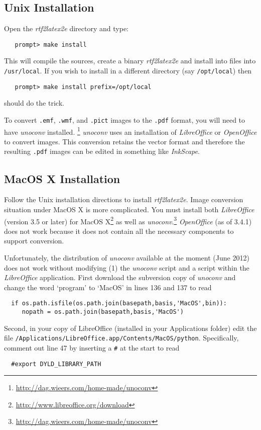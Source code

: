 \documentclass{article}
\begin{document}
\subsection{Unix Installation\label{Unix_install}}
Open the \textit{rtf2latex2e} directory and type:
\begin{verbatim}
   prompt> make install
\end{verbatim}
This will compile the sources, create a binary 
\textit{rtf2latex2e} and install into files into \texttt{/usr/local}.
If you wish to install in a different directory (say \texttt{/opt/local})
then 
\begin{verbatim}
   prompt> make install prefix=/opt/local
\end{verbatim}
should do the trick.

To convert \texttt{.emf}, \texttt{.wmf}, and \texttt{.pict} images to
the \texttt{.pdf} format, you will need to have \textit{unoconv} installed.%
\footnote{\url{http://dag.wieers.com/home-made/unoconv}}  \textit{unoconv} uses
an installation of \textit{LibreOffice} or \textit{OpenOffice} to convert images.
This conversion retains the vector format and therefore the resulting \texttt{.pdf}
images can be edited in something like \textit{InkScape}.

\subsection{MacOS X Installation}

Follow the Unix installation directions to install \textit{rtf2latex2e}.
Image conversion situation under MacOS X is more complicated.  You must install
both \textit{LibreOffice} (version 3.5 or later) for
MacOS X\footnote{\url{http://www.libreoffice.org/download}}
as well as \textit{unoconv}.\footnote{\url{http://dag.wieers.com/home-made/unoconv}}
\textit{OpenOffice} (as of 3.4.1) does not work because it
does not contain all the necessary components to support conversion.

Unfortunately, the distribution of \textit{unoconv} available at the moment
(June 2012) does not work without modifying (1) the \textit{unoconv} script and
a script within the \textit{LibreOffice} application. First download the
subversion copy of \textit{unoconv} and change the word `program' to `MacOS' in
lines 136 and 137 to read
\begin{verbatim}
  if os.path.isfile(os.path.join(basepath,basis,'MacOS',bin)):
     nopath = os.path.join(basepath,basis,'MacOS')
\end{verbatim}
Second, in your copy of LibreOffice (installed in your Applications folder) 
edit the file
\texttt{/Applications/LibreOffice.app/Contents/MacOS/python}.
Specifically, comment out line 47 by inserting a \texttt{\#} at the start to read
\begin{verbatim}
  #export DYLD_LIBRARY_PATH
\end{verbatim}
\end{document}
